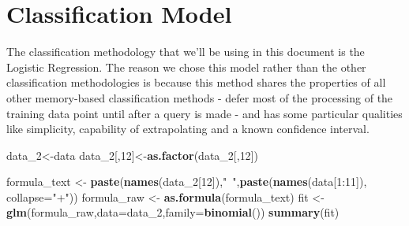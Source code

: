 \documentclass[]{article}
\newenvironment{Shaded}{\begin{snugshade}}{\end{snugshade}}
\newcommand{\KeywordTok}[1]{\textcolor[rgb]{0.13,0.29,0.53}{\textbf{{#1}}}}
\newcommand{\DataTypeTok}[1]{\textcolor[rgb]{0.13,0.29,0.53}{{#1}}}
\newcommand{\DecValTok}[1]{\textcolor[rgb]{0.00,0.00,0.81}{{#1}}}
\newcommand{\StringTok}[1]{\textcolor[rgb]{0.31,0.60,0.02}{{#1}}}
\newcommand{\NormalTok}[1]{{#1}}
\begin{document}
\newpage

\section{Classification Model}\label{classification-model}

The classification methodology that we'll be using in this document is
the Logistic Regression. The reason we chose this model rather than the
other classification methodologies is because this method shares the
properties of all other memory-based classification methods - defer most
of the processing of the training data point until after a query is made
- and has some particular qualities like simplicity, capability of
extrapolating and a known confidence interval. \cite{log}

\begin{Shaded}
\begin{Highlighting}[]
\NormalTok{data_2<-data}
\NormalTok{data_2[,}\DecValTok{12}\NormalTok{]<-}\KeywordTok{as.factor}\NormalTok{(data_2[,}\DecValTok{12}\NormalTok{])}

\NormalTok{formula_text <-}\StringTok{ }\KeywordTok{paste}\NormalTok{(}\KeywordTok{names}\NormalTok{(data_2[}\DecValTok{12}\NormalTok{]),}\StringTok{"~"}\NormalTok{,}\KeywordTok{paste}\NormalTok{(}\KeywordTok{names}\NormalTok{(data[}\DecValTok{1}\NormalTok{:}\DecValTok{11}\NormalTok{]), }\DataTypeTok{collapse=}\StringTok{"+"}\NormalTok{))}
\NormalTok{formula_raw <-}\StringTok{ }\KeywordTok{as.formula}\NormalTok{(formula_text)}
\NormalTok{fit <-}\StringTok{ }\KeywordTok{glm}\NormalTok{(formula_raw,}\DataTypeTok{data=}\NormalTok{data_2,}\DataTypeTok{family=}\KeywordTok{binomial}\NormalTok{())}
\KeywordTok{summary}\NormalTok{(fit)}
\end{Highlighting}
\end{Shaded}
\end{document}
